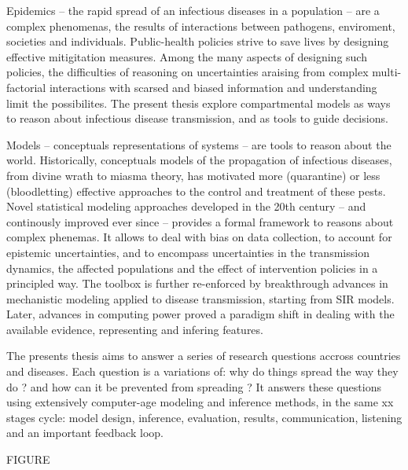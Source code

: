 Epidemics -- the rapid spread of an infectious diseases in a population -- are a complex phenomenas, the results of interactions between pathogens, enviroment, societies and individuals\cite{Buckee:ThinkingClearlySocial:2021, Heesterbeek:ModelingInfectiousDisease:2015,Rinaldo:RiverNetworksEcological:2020a}. Public-health policies strive to save lives by designing effective mitigitation measures. Among the many aspects of designing such policies, the difficulties of reasoning on uncertainties araising from complex multi-factorial interactions with scarsed and biased information and understanding limit the possibilites. The present thesis explore compartmental models as ways to reason about infectious disease transmission, and as tools to guide decisions. 

Models -- conceptuals representations of systems -- are tools to reason about the world. Historically, conceptuals models of the propagation of infectious diseases, from divine wrath to miasma theory, has motivated more (quarantine) or less (bloodletting) effective approaches to the control and treatment of these pests.
Novel statistical modeling approaches\cite[-3\baselineskip]{Freedman:AssociationCausationRemarks:1999} developed in the 20th century -- and continously improved ever since\cite{Gelman:WhatAreMost:2021} --  provides a formal framework to reasons about complex phenemas. It allows to deal with bias on data collection, to account for epistemic uncertainties, and to encompass uncertainties in the transmission dynamics, the affected populations and the effect of intervention policies in a principled way. The toolbox is further re-enforced by breakthrough advances in mechanistic modeling applied to disease transmission, starting from SIR models\cite{Kermack:ContributionMathematicalTheory:1927, Anderson:PopulationBiologyInfectious:1979}. Later, advances in computing power proved a paradigm shift in dealing with the available evidence, representing and infering features. 

The presents thesis aims to answer a series of research questions accross countries and diseases. Each question is a variations of: why do things spread the way they do ? and how can it be prevented from spreading ? It answers these questions using extensively computer-age modeling and inference methods, in the same xx stages cycle: model design, inference, evaluation, results, communication, listening and an important feedback loop.

FIGURE

